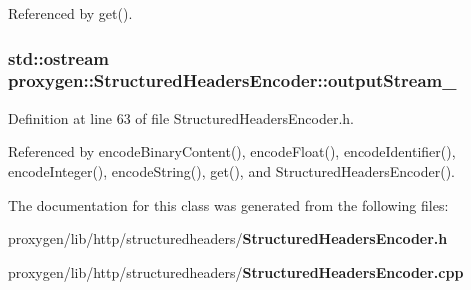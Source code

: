 Referenced by get().

\subsubsection[{output\+Stream\+\_\+}]{\setlength{\rightskip}{0pt plus 5cm}std\+::ostream proxygen\+::\+Structured\+Headers\+Encoder\+::output\+Stream\+\_\+\hspace{0.3cm}{\ttfamily [private]}}\label{classproxygen_1_1StructuredHeadersEncoder_a27d4b8a79e37527016add546327e1212}


Definition at line 63 of file Structured\+Headers\+Encoder.\+h.



Referenced by encode\+Binary\+Content(), encode\+Float(), encode\+Identifier(), encode\+Integer(), encode\+String(), get(), and Structured\+Headers\+Encoder().



The documentation for this class was generated from the following files\+:\begin{DoxyCompactItemize}
\item 
proxygen/lib/http/structuredheaders/{\bf Structured\+Headers\+Encoder.\+h}\item 
proxygen/lib/http/structuredheaders/{\bf Structured\+Headers\+Encoder.\+cpp}\end{DoxyCompactItemize}
